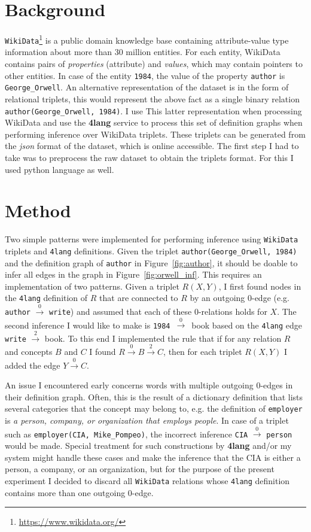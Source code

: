 \section{Background}
\texttt{WikiData}\footnote{\url{https://www.wikidata.org/}}
is a public domain knowledge base containing
attribute-value type information about more than 30 million entities.
For each entity, WikiData contains pairs of \textit{properties}
(attribute) and \textit{values}, which may contain pointers to other
entities. In case of the entity \texttt{1984}, the value of the property
\texttt{author} is \texttt{George\_Orwell}. An alternative
representation of the dataset is in the form of relational triplets,
this would represent the above fact as a single binary relation
\texttt{author(George\_Orwell, 1984)}. I use This latter representation
when processing WikiData and use the \textbf{4lang} service to process this set of
definition graphs when performing inference over WikiData triplets. These triplets can be generated from the \textit{json} format of the dataset, which is online accessible. The first step I had to take was to preprocess the raw dataset to obtain the triplets format. For this I used python language as well.

\section{Method}
Two simple patterns were implemented for performing inference using
\texttt{WikiData}
triplets and \texttt{4lang} definitions. Given the triplet
\texttt{author(George\_Orwell, 1984)} and the definition graph
of \texttt{author} in Figure~\ref{fig:author}, it should be doable to
infer all edges in the graph in Figure~\ref{fig:orwell_inf}. This
requires an implementation of two patterns. Given a triplet $R(X, Y)$, I
first found nodes in the \texttt{4lang} definition of $R$ that are connected
to $R$ by an outgoing 0-edge (e.g. \texttt{author} $\xrightarrow0$
\texttt{write}) and assumed that each of these 0-relations holds for $X$.
The second inference I would like to make is \texttt{1984}~$\xrightarrow0$~book
based on the \texttt{4lang} edge \texttt{write} $\xrightarrow2$ book. To this end
I implemented the rule that if for any relation $R$ and concepts $B$ and $C$
I found $R \xrightarrow0 B \xrightarrow2 C$, then for each triplet $R(X, Y)$ I
added the edge $Y \xrightarrow0 C$. 

An issue I encountered early concerns words with multiple outgoing
0-edges in their definition graph. Often, this is the result of a
dictionary definition that lists several categories that the concept may
belong to, e.g. the definition of \texttt{employer} is \textit{a person,
	company, or organization that employs people}. In case of a triplet such
as \texttt{employer(CIA, Mike\_Pompeo)}, the incorrect inference
\texttt{CIA} $\xrightarrow0$ \texttt{person} would be made. Special treatment for such
constructions by \textbf{4lang} and/or my system might handle these cases and
make the inference that the CIA is either a person, a company, or an
organization, but for the purpose of the present experiment I decided
to discard all \texttt{WikiData} relations whose \texttt{4lang}
definition contains more than one outgoing 0-edge.

